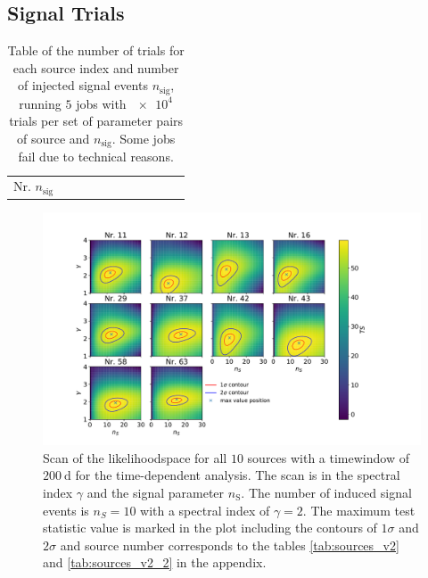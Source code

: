 \newpage
\subsection{Signal Trials}

\begin{table}
  \centering
  \caption{Table of the number of trials for each source index and number of injected signal events $n_\text{sig}$, running $\num{5}$ jobs with $\num{e4}$ trials per set of parameter pairs of source and $n_\text{sig}$. Some jobs fail due to technical reasons.}
  \label{tab:trials_sig_time_dep_table}
  \begin{tabular}{>{\centering\arraybackslash}p{.9cm}|%
                    cccccccccc}
    \toprule
    \: Nr. \newline $n_\text{sig}$ \: & 
    \toprule
    
    \toprule
  \end{tabular}
\end{table}

\begin{figure}
    \centering
    \includegraphics[width=\linewidth]{Plots/appendix/llh_scan.pdf}
    \caption{Scan of the likelihoodspace for all $\num{10}$ sources with a timewindow of $\SI{200}{\day}$ for the time-dependent analysis. The scan is in the spectral index $\gamma$ and the signal parameter $n_\text{S}$. The number of induced signal events is $n_S = \num{10}$ with a spectral index of $\gamma = 2$. The maximum test statistic value is marked in the plot including the contours of $\num{1}\sigma$ and $\num{2}\sigma$ and source number corresponds to the tables \ref{tab:sources_v2} and \ref{tab:sources_v2_2} in the appendix.}
    \label{fig:llh_scan_time_dep_all}
\end{figure}

